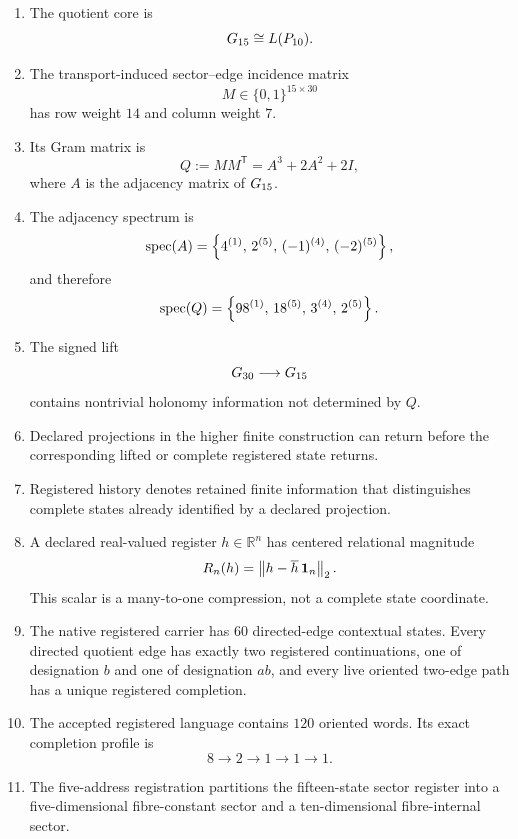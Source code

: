 \begin{enumerate}[label=(\roman*)]

\item The quotient core is
\[
G_{15}\cong L(P_{10}).
\]

\item The transport-induced sector--edge incidence matrix
\[
M\in\{0,1\}^{15\times30}
\]
has row weight \(14\) and column weight \(7\).

\item Its Gram matrix is
\[
Q:=MM^{\mathsf T}
  =A^{3}+2A^{2}+2I,
\]
where \(A\) is the adjacency matrix of \(G_{15}\).

\item The adjacency spectrum is
\[
\operatorname{spec}(A)
=
\left\{
4^{(1)},\,
2^{(5)},\,
(-1)^{(4)},\,
(-2)^{(5)}
\right\},
\]
and therefore
\[
\operatorname{spec}(Q)
=
\left\{
98^{(1)},\,
18^{(5)},\,
3^{(4)},\,
2^{(5)}
\right\}.
\]

\item The signed lift
\[
G_{30}\longrightarrow G_{15}
\]
contains nontrivial holonomy information not determined by \(Q\).

\item Declared projections in the higher finite construction can
return before the corresponding lifted or complete registered state
returns.

\item Registered history denotes retained finite information that
distinguishes complete states already identified by a declared
projection.

\item A declared real-valued register
\(h\in\mathbb R^n\) has centered relational magnitude
\[
R_n(h)
=
\left\|
h-\overline h\,\mathbf{1}_n
\right\|_2.
\]
This scalar is a many-to-one compression, not a complete state
coordinate.

\item The native registered carrier has \(60\) directed-edge
contextual states.  Every directed quotient edge has exactly two
registered continuations, one of designation \(b\) and one of
designation \(ab\), and every live oriented two-edge path has a unique
registered completion.

\item The accepted registered language contains \(120\) oriented
words.  Its exact completion profile is
\[
8\longrightarrow2\longrightarrow1\longrightarrow1\longrightarrow1.
\]

\item The five-address registration partitions the fifteen-state
sector register into a five-dimensional fibre-constant sector and a
ten-dimensional fibre-internal sector.

\end{enumerate}

